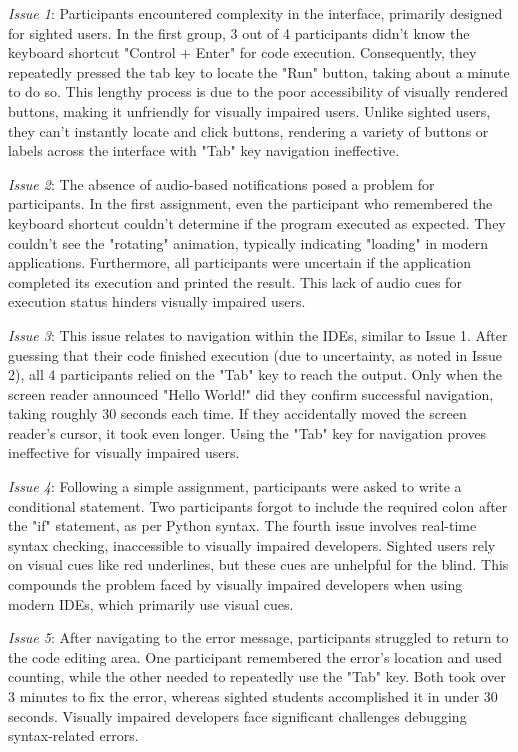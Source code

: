 {\em Issue 1}: Participants encountered complexity in the interface, primarily designed for sighted users. In the first group, 3 out of 4 participants didn't know the keyboard shortcut "Control + Enter" for code execution. Consequently, they repeatedly pressed the tab key to locate the "Run" button, taking about a minute to do so. This lengthy process is due to the poor accessibility of visually rendered buttons, making it unfriendly for visually impaired users. Unlike sighted users, they can't instantly locate and click buttons, rendering a variety of buttons or labels across the interface with "Tab" key navigation ineffective.

{\em Issue 2}: The absence of audio-based notifications posed a problem for participants. In the first assignment, even the participant who remembered the keyboard shortcut couldn't determine if the program executed as expected. They couldn't see the "rotating" animation, typically indicating "loading" in modern applications. Furthermore, all participants were uncertain if the application completed its execution and printed the result. This lack of audio cues for execution status hinders visually impaired users.

{\em Issue 3}: This issue relates to navigation within the IDEs, similar to Issue 1. After guessing that their code finished execution (due to uncertainty, as noted in Issue 2), all 4 participants relied on the "Tab" key to reach the output. Only when the screen reader announced "Hello World!" did they confirm successful navigation, taking roughly 30 seconds each time. If they accidentally moved the screen reader's cursor, it took even longer. Using the "Tab" key for navigation proves ineffective for visually impaired users.

{\em Issue 4}: Following a simple assignment, participants were asked to write a conditional statement. Two participants forgot to include the required colon after the "if" statement, as per Python syntax. The fourth issue involves real-time syntax checking, inaccessible to visually impaired developers. Sighted users rely on visual cues like red underlines, but these cues are unhelpful for the blind. This compounds the problem faced by visually impaired developers when using modern IDEs, which primarily use visual cues.

{\em Issue 5}: After navigating to the error message, participants struggled to return to the code editing area. One participant remembered the error's location and used counting, while the other needed to repeatedly use the "Tab" key. Both took over 3 minutes to fix the error, whereas sighted students accomplished it in under 30 seconds. Visually impaired developers face significant challenges debugging syntax-related errors.

